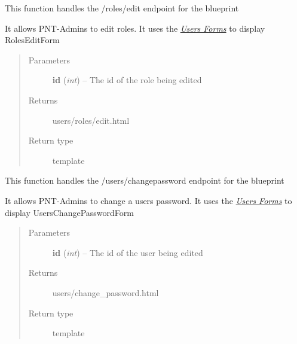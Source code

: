 \documentclass[letterpaper,10pt,english]{sphinxmanual}
\begin{document}
\begin{fulllineitems}
\label{dev-users:cagenix.users.views.roles_edit}
This function handles the /roles/edit endpoint for the blueprint

It allows PNT-Admins to edit roles.  It uses the {\hyperref[dev-users:users-forms-label]{\emph{Users Forms}}}
to display RolesEditForm
\begin{quote}\begin{description}
\item[{Parameters}] \leavevmode
\textbf{id} (\emph{int}) -- The id of the role being edited

\item[{Returns}] \leavevmode
users/roles/edit.html

\item[{Return type}] \leavevmode
template

\end{description}\end{quote}

\end{fulllineitems}


\begin{fulllineitems}
\label{dev-users:cagenix.users.views.users_changepassword}
This function handles the /users/changepassword endpoint for the blueprint

It allows PNT-Admins to change a users password.  It uses the
{\hyperref[dev-users:users-forms-label]{\emph{Users Forms}}} to display UsersChangePasswordForm
\begin{quote}\begin{description}
\item[{Parameters}] \leavevmode
\textbf{id} (\emph{int}) -- The id of the user being edited

\item[{Returns}] \leavevmode
users/change\_password.html

\item[{Return type}] \leavevmode
template

\end{description}\end{quote}

\end{fulllineitems}
\end{document}
